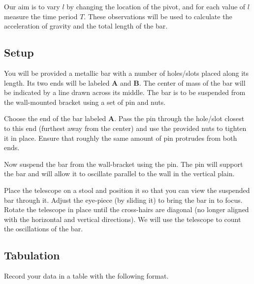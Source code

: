 \documentclass{article}
\begin{document}
      Our aim is to vary $l$ by changing the location of the pivot, and for each value of $l$ measure the time period $T$. These observations will be used to calculate the acceleration of gravity and the total length of the bar.

      \subsection*{Setup}

         You will be provided a metallic bar with a number of holes/slots placed along its length. Its two ends will be labeled \textbf{A} and \textbf{B}. The center of mass of the bar will be indicated by a line drawn across its middle. The bar is to be suspended from the wall-mounted bracket using a set of pin and nuts.

         Choose the end of the bar labeled \textbf{A}. Pass the pin through the hole/slot closest to this end (furthest away from the center) and use the provided nuts to tighten it in place. Ensure that roughly the same amount of pin protrudes from both ends.

         Now suspend the bar from the wall-bracket using the pin. The pin will support the bar and will allow it to oscillate parallel to the wall in the vertical plain.

         Place the telescope on a stool and position it so that you can view the suspended bar through it. Adjust the eye-piece (by sliding it) to bring the bar in to focus. Rotate the telescope in place until the cross-hairs are diagonal (no longer aligned with the horizontal and vertical directions). We will use the telescope to count the oscillations of the bar.

      \subsection*{Tabulation}

         Record your data in a table with the following format.
\end{document}
